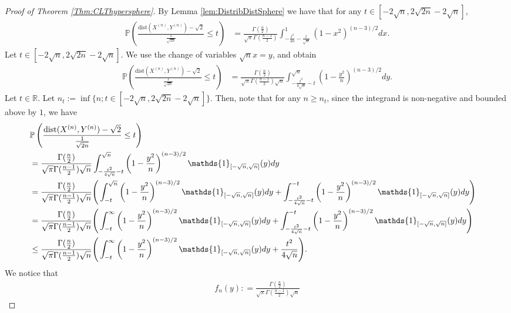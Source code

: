 \documentclass[10pt]{amsart}
\def\dist{\text{dist}}
\numberwithin{equation}{section}
\begin{document}
\begin{proof}[Proof of Theorem \ref{Thm:CLThypersphere}]
By Lemma \ref{lem:DistribDistSphere} we have that for any $t \in [-2\sqrt{n},2\sqrt{2n} -2\sqrt{n}  ]$,
\begin{align*}
\mathbb{P} \left(\frac{\dist(X^{(n)},Y^{(n)}) - \sqrt{2}}{\frac{1}{\sqrt{2n}}} \leq t\right) & =
 \frac{\Gamma ( \frac{n}{2} ) }{ \sqrt{\pi} \Gamma ( \frac{n-1}{2} )} 
 \int_{ -\frac{t^2}{4n} - \frac{t}{\sqrt{n}}      }^{1} (1- x^2)^{(n-3)/2} dx .
\end{align*}
Let $t \in [-2\sqrt{n},2\sqrt{2n} -2\sqrt{n} ]$. We use the change of variables $\sqrt{n} x = y$, and obtain
\begin{align*}
\mathbb{P} \left(\frac{\dist(X^{(n)},Y^{(n)}) - \sqrt{2}}{\frac{1}{\sqrt{2n}}} \leq t\right) & =
 \frac{\Gamma ( \frac{n}{2} ) }{ \sqrt{\pi} \Gamma ( \frac{n-1}{2} ) \sqrt{n}} 
 \int_{ -\frac{t^2}{4\sqrt{n}} - t      }^{\sqrt{n}} \left(1- \frac{y^2}{n} \right)^{(n-3)/2} dy.
\end{align*}
Let $t \in \mathbb{R}$. Let $n_t := \inf \lbrace n  ; t \in [-2\sqrt{n},2\sqrt{2n} -2\sqrt{n}  ] \rbrace$. Then, note that for any $n \geq n_t$, since the integrand is non-negative and bounded above by $1$, we have 
\begin{align*}
& \mathbb{P} \left(\frac{\dist(X^{(n)},Y^{(n)}) - \sqrt{2}}{\frac{1}{\sqrt{2n}}} \leq t\right) \cr
& =  \frac{\Gamma ( \frac{n}{2} ) }{ \sqrt{\pi} \Gamma ( \frac{n-1}{2} ) \sqrt{n}} 
 \int_{ -\frac{t^2}{4\sqrt{n}} - t}^{\sqrt{n}} \left(1- \frac{y^2}{n}\right)^{(n-3)/2} \mathds{1}_{[-\sqrt{n} , \sqrt{n}]} (y) dy   \cr
& = \frac{\Gamma ( \frac{n}{2} ) }{ \sqrt{\pi} \Gamma ( \frac{n-1}{2} ) \sqrt{n}}  \Bigg(  \int_{ -t}^{\sqrt{n}} \left(1- \frac{y^2}{n}\right)^{(n-3)/2} \mathds{1}_{[-\sqrt{n} , \sqrt{n}]} (y) dy   + \int_{-\frac{t^2}{4\sqrt{n}} - t }^{-t} \left(1- \frac{y^2}{n}\right)^{(n-3)/2} \mathds{1}_{[-\sqrt{n} , \sqrt{n}]} (y)  dy  \Bigg) \cr
& = \frac{\Gamma ( \frac{n}{2} ) }{ \sqrt{\pi} \Gamma ( \frac{n-1}{2} ) \sqrt{n}}  \Bigg(  \int_{-t}^{\infty} \left(1- \frac{y^2}{n}\right)^{(n-3)/2} \mathds{1}_{[-\sqrt{n} , \sqrt{n}]} (y) dy + \int_{-\frac{t^2}{4\sqrt{n}} - t }^{-t} \left(1- \frac{y^2}{n}\right)^{(n-3)/2} \mathds{1}_{[-\sqrt{n} , \sqrt{n}]} (y) dy \Bigg) \cr
& \leq  \frac{\Gamma ( \frac{n}{2} ) }{ \sqrt{\pi} \Gamma ( \frac{n-1}{2} ) \sqrt{n}}  \Bigg(  \int_{-t}^{\infty} \left(1- \frac{y^2}{n}\right)^{(n-3)/2} \mathds{1}_{[-\sqrt{n} , \sqrt{n}]} (y) dy + \frac{t^2}{4\sqrt{n}} \Bigg).
\end{align*}
We notice that
\begin{align*}
f_n (y) : = \frac{\Gamma ( \frac{n}{2} ) }{ \sqrt{\pi} \Gamma ( \frac{n-1}{2} ) \sqrt{n}}

\end{align*}
\end{proof}
\end{document}
